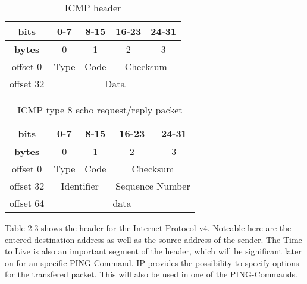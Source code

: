 \begin{table}[H]
	\centering
	\label{abstract-icmp-header}
	\begin{tabular}{|c|c|c|c|c|}
		\hline
		\textbf{bits}  & 0-7  & 8-15 & 16-23         & 24-31         \\ \hline
		\textbf{bytes} & 0    & 1    & 2             & 3             \\ \hline
		offset 0       & Type & Code & \multicolumn{2}{c|}{Checksum} \\ \hline
		offset 32      & \multicolumn{4}{c|}{Data}                   \\ \hline
	\end{tabular}
	\caption{ICMP header}
\end{table}

\begin{table}[H]
	\centering
	\label{icmp-echo-request-header}
	\begin{tabular}{|c|c|c|c|c|}
		\hline
		\textbf{bits}                   & 0-7            & 8-15           & 16-23             & 24-31            \\ \hline
		\textbf{bytes}                  & 0              & 1              & 2                 & 3                \\ \hline
		offset 0                        & Type           & Code           & \multicolumn{2}{c|}{Checksum}        \\ \hline
		\multicolumn{1}{|l|}{offset 32} & \multicolumn{2}{c|}{Identifier} & \multicolumn{2}{c|}{Sequence Number} \\ \hline
		offset 64                       & \multicolumn{4}{c|}{data}                                              \\ \hline
	\end{tabular}
	\caption{ICMP type 8 echo request/reply packet }
	
\end{table}

Table 2.3 shows the header for the Internet Protocol v4. Noteable here are the entered destination address as well as the source address of the sender. The Time to Live is also an important segment of the header, which will be significant later on for an specific PING-Command. IP provides the possibility to specify options for the transfered packet. This will also be used in one of the PING-Commands.

